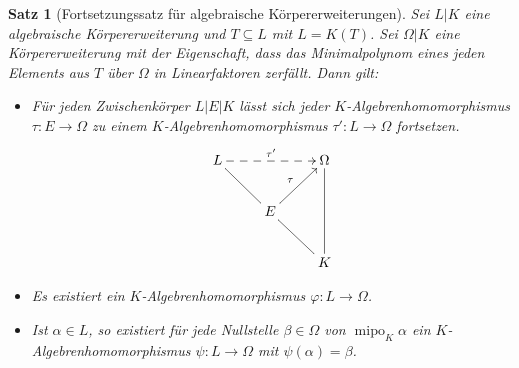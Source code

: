 \documentclass[a4paper, twoside, 11pt, ngerman]{report}
\DeclareMathOperator{\mipo}{mipo}
\theoremstyle{definistyle}
\newtheorem{satz}{Satz}[section]
\theoremstyle{remark}
\begin{document}
\begin{satz}[Fortsetzungssatz für algebraische Körpererweiterungen]\label{satz:fortsetzungssatz_algebraische_koerpererweiterungen}
Sei $L|K$ eine algebraische Körpererweiterung und $T \subseteq L$ mit $L = K(T)$. Sei $\Omega|K$ eine Körpererweiterung mit der Eigenschaft, dass das Minimalpolynom eines jeden Elements aus $T$ über $\Omega$ in Linearfaktoren zerfällt. Dann gilt:
\begin{itemize}
    \item[(a)] Für jeden Zwischenkörper $L|E|K$ lässt sich jeder $K$-Algebrenhomomorphismus $\tau \colon E \to \Omega$ zu einem $K$-Algebrenhomomorphismus $\tau' \colon L \to \Omega$ fortsetzen.
    \[
\xymatrix{
L \ar@{-}[dr] \ar@{-->}[rr]^{\tau'} & & \Omega \ar@{-}[dd] \\
 & E \ar[ur]^\tau \ar@{-}[dr] &  \\
 & & K
}
\]
    \item[(b)] Es existiert ein $K$-Algebrenhomomorphismus $\varphi \colon L \to \Omega$.
    \item[(c)] Ist $\alpha \in L$, so existiert für jede Nullstelle $\beta \in \Omega$ von $\mipo_K \alpha$ ein $K$-Algebrenhomomorphismus $\psi \colon L \to \Omega$ mit $\psi(\alpha) = \beta$.
\end{itemize}
\end{satz}
\end{document}
